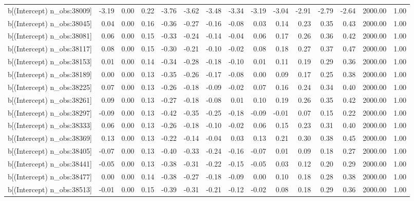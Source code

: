 \begin{table}[ht]
\begin{tabular}{rrrrrrrrrrrrrrr}
  b[(Intercept) n\_obs:38009] & -3.19 & 0.00 & 0.22 & -3.76 & -3.62 & -3.48 & -3.34 & -3.19 & -3.04 & -2.91 & -2.79 & -2.64 & 2000.00 & 1.00 \\ 
  b[(Intercept) n\_obs:38045] & 0.04 & 0.00 & 0.16 & -0.36 & -0.27 & -0.16 & -0.08 & 0.03 & 0.14 & 0.23 & 0.35 & 0.43 & 2000.00 & 1.00 \\ 
  b[(Intercept) n\_obs:38081] & 0.06 & 0.00 & 0.15 & -0.33 & -0.24 & -0.14 & -0.04 & 0.06 & 0.17 & 0.26 & 0.36 & 0.42 & 2000.00 & 1.00 \\ 
  b[(Intercept) n\_obs:38117] & 0.08 & 0.00 & 0.15 & -0.30 & -0.21 & -0.10 & -0.02 & 0.08 & 0.18 & 0.27 & 0.37 & 0.47 & 2000.00 & 1.00 \\ 
  b[(Intercept) n\_obs:38153] & 0.01 & 0.00 & 0.14 & -0.34 & -0.28 & -0.18 & -0.10 & 0.01 & 0.11 & 0.19 & 0.29 & 0.36 & 2000.00 & 1.00 \\ 
  b[(Intercept) n\_obs:38189] & 0.00 & 0.00 & 0.13 & -0.35 & -0.26 & -0.17 & -0.08 & 0.00 & 0.09 & 0.17 & 0.25 & 0.38 & 2000.00 & 1.00 \\ 
  b[(Intercept) n\_obs:38225] & 0.07 & 0.00 & 0.13 & -0.26 & -0.18 & -0.09 & -0.02 & 0.07 & 0.16 & 0.24 & 0.34 & 0.40 & 2000.00 & 1.00 \\ 
  b[(Intercept) n\_obs:38261] & 0.09 & 0.00 & 0.13 & -0.27 & -0.18 & -0.08 & 0.01 & 0.10 & 0.19 & 0.26 & 0.35 & 0.42 & 2000.00 & 1.00 \\ 
  b[(Intercept) n\_obs:38297] & -0.09 & 0.00 & 0.13 & -0.42 & -0.35 & -0.25 & -0.18 & -0.09 & -0.01 & 0.07 & 0.15 & 0.22 & 2000.00 & 1.00 \\ 
  b[(Intercept) n\_obs:38333] & 0.06 & 0.00 & 0.13 & -0.26 & -0.18 & -0.10 & -0.02 & 0.06 & 0.15 & 0.23 & 0.31 & 0.40 & 2000.00 & 1.00 \\ 
  b[(Intercept) n\_obs:38369] & 0.13 & 0.00 & 0.13 & -0.22 & -0.14 & -0.04 & 0.03 & 0.13 & 0.21 & 0.30 & 0.38 & 0.45 & 2000.00 & 1.00 \\ 
  b[(Intercept) n\_obs:38405] & -0.07 & 0.00 & 0.13 & -0.40 & -0.33 & -0.24 & -0.16 & -0.07 & 0.01 & 0.09 & 0.18 & 0.27 & 2000.00 & 1.00 \\ 
  b[(Intercept) n\_obs:38441] & -0.05 & 0.00 & 0.13 & -0.38 & -0.31 & -0.22 & -0.15 & -0.05 & 0.03 & 0.12 & 0.20 & 0.29 & 2000.00 & 1.00 \\ 
  b[(Intercept) n\_obs:38477] & 0.00 & 0.00 & 0.14 & -0.38 & -0.27 & -0.18 & -0.09 & 0.00 & 0.10 & 0.18 & 0.28 & 0.38 & 2000.00 & 1.00 \\ 
  b[(Intercept) n\_obs:38513] & -0.01 & 0.00 & 0.15 & -0.39 & -0.31 & -0.21 & -0.12 & -0.02 & 0.08 & 0.18 & 0.29 & 0.36 & 2000.00 & 1.00 \\ 

\end{tabular}
\end{table}
